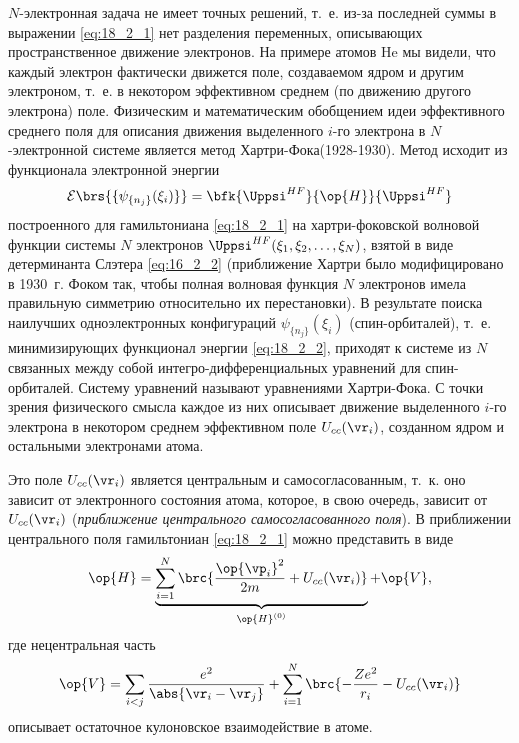 $N$-электронная задача не имеет точных решений, т.~е. из-за последней суммы в выражении \eqref{eq:18_2_1} нет разделения переменных, описывающих пространственное движение электронов. На примере атомов He мы видели, что каждый электрон фактически движется поле, создаваемом ядром и другим электроном, т.~е. в некотором эффективном среднем (по движению другого электрона) поле. Физическим и математическим обобщением идеи эффективного среднего поля для описания движения выделенного $i$-го электрона в $N$-электронной системе является метод Хартри-Фока\footnotemark (1928-1930). Метод исходит из функционала электронной энергии
%
\begin{equation}
\label{eq:18_2_2}
\mathcal{E}\brs{\{\psi_{\{n_j\}}(\xi_i)\}} = \bfk{\Uppsi^{HF}}{\op{H}}{\Uppsi^{HF}}
\end{equation}
построенного для гамильтониана \eqref{eq:18_2_1} на хартри-фоковской волновой функции системы $N$ электронов $\Uppsi^{HF}(\xi_1, \xi_2, \dots, \xi_N)$, взятой в виде детерминанта Слэтера \eqref{eq:16_2_2} (приближение Хартри было модифицировано в 1930~г. Фоком так, чтобы полная волновая функция $N$ электронов имела правильную симметрию относительно их перестановки). В результате поиска наилучших одноэлектронных конфигураций $\psi_{\{n_j\}}(\xi_i)$ (спин-орбиталей), т.~е. минимизирующих функционал энергии \eqref{eq:18_2_2}, приходят к системе из $N$ связанных между собой интегро-дифференциальных уравнений для спин-орбиталей. Систему уравнений называют уравнениями Хартри-Фока. С точки зрения физического смысла каждое из них описывает движение выделенного $i$-го электрона в некотором среднем эффективном поле $U_{cc}(\vr_i)$, созданном ядром и остальными электронами атома. 


Это поле $U_{cc}(\vr_i)$ является центральным и самосогласованным, т.~к. оно зависит от электронного состояния атома, которое, в свою очередь, зависит от $U_{cc}(\vr_i)$ ({\em приближение центрального самосогласованного поля}). В приближении центрального поля гамильтониан \eqref{eq:18_2_1} можно представить в виде
\begin{equation}
\label{eq:18_2_3}
\op{H} = \underbrace{\sum_{i=1}^{N} \brc{\frac{\op{\vp_i}^2}{2m} + U_{cc}(\vr_i)}}_{\op{H}^{(0)}} + \op{V},
\end{equation}
где нецентральная часть
$$
\op{V} = \sum_{i<j} \frac{e^2}{\abs{\vr_i - \vr_j}} + \sum_{i=1}^N \brc{-\frac{Ze^2}{r_i} - U_{cc}(\vr_i)}
$$
описывает остаточное кулоновское взаимодействие в атоме.

